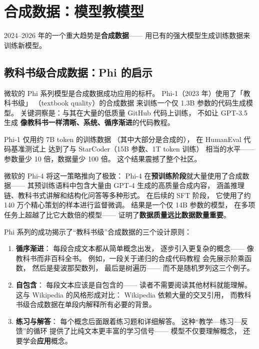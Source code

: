 \section{合成数据：模型教模型}

2024--2026 年的一个重大趋势是\textbf{合成数据}——
用已有的强大模型生成训练数据来训练新模型。

\subsection{教科书级合成数据：Phi 的启示}

微软的 Phi 系列模型是合成数据成功应用的标杆。
Phi-1（2023 年）使用了「教科书级」
（textbook quality）的合成数据
来训练一个仅 1.3B 参数的代码生成模型。
关键洞察是：与其在大量的低质量 GitHub 代码上训练，
不如让 GPT-3.5 生成
\textbf{像教科书一样清晰、系统、循序渐进}的代码教程。

Phi-1 仅用约 7B token 的训练数据
（其中大部分是合成的），
在 HumanEval 代码基准测试上
达到了与 StarCoder（15B 参数、1T token 训练）
相当的水平——
参数量少 10 倍，数据量少 100 倍。
这个结果震撼了整个社区。

微软的 Phi-4 将这一策略推向了极致：
Phi-4 在\textbf{预训练阶段}就大量使用了合成数据——
其预训练语料中包含大量由 GPT-4 生成的高质量合成内容，
涵盖推理链、教科书式讲解和结构化问答等多种形式。
在后续的 SFT 阶段，
它使用了约 140 万个精心策划的样本进行监督微调。
结果是一个仅 14B 参数的模型，
在多项任务上超越了比它大数倍的模型——
证明了\textbf{数据质量远比数据数量重要}。

Phi 系列的成功揭示了``教科书级''合成数据的三个设计原则：

\begin{enumerate}[noitemsep]
  \item \textbf{循序渐进}：
        每段合成文本都从简单概念出发，
        逐步引入更复杂的概念——
        像教科书而非百科全书。
        例如，一段关于递归的合成代码教程
        会先展示阶乘函数，
        然后是斐波那契数列，
        最后是树遍历——
        而不是随机罗列这三个例子。
  \item \textbf{自包含}：
        每段文本应该是自包含的——
        读者不需要阅读其他材料就能理解。
        这与 Wikipedia 的风格形成对比：
        Wikipedia 依赖大量的交叉引用，
        而教科书级合成数据在单段内解释所有必要的背景。
  \item \textbf{练习与解答}：
        每个概念后面跟着练习题和详细解答。
        这种``教学—练习—反馈''的循环
        提供了比纯文本更丰富的学习信号——
        模型不仅要理解概念，
        还要学会\textbf{应用}概念。
\end{enumerate}


